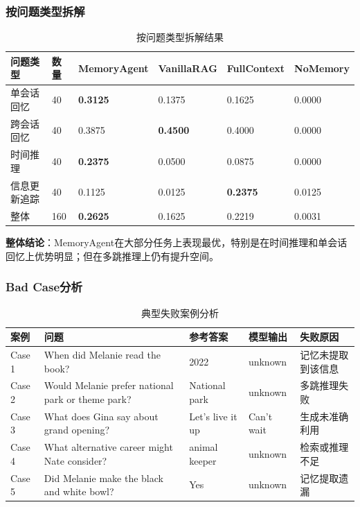 \documentclass[11pt]{article}
\begin{document}
\subsubsection{按问题类型拆解}

\begin{table}[H]
    \centering
    \begin{tabular}{|l|l|l|l|l|l|}
        \hline
        问题类型 & 数量 & MemoryAgent & VanillaRAG & FullContext & NoMemory \\
        \hline
        单会话回忆 & 40 & \textbf{0.3125} & 0.1375 & 0.1625 & 0.0000 \\
        \hline
        跨会话回忆 & 40 & 0.3875 & \textbf{0.4500} & 0.4000 & 0.0000 \\
        \hline
        时间推理 & 40 & \textbf{0.2375} & 0.0500 & 0.0875 & 0.0000 \\
        \hline
        信息更新追踪 & 40 & 0.1125 & 0.0125 & \textbf{0.2375} & 0.0125 \\
        \hline
        整体 & 160 & \textbf{0.2625} & 0.1625 & 0.2219 & 0.0031 \\
        \hline
    \end{tabular}
    \caption{按问题类型拆解结果}
\end{table}

\textbf{整体结论}：MemoryAgent在大部分任务上表现最优，特别是在时间推理和单会话回忆上优势明显；但在多跳推理上仍有提升空间。

\subsubsection{Bad Case分析}

\begin{table}[H]
    \centering
    \begin{tabularx}{\textwidth}{|l|X|l|l|l|}
        \hline
        案例 & 问题 & 参考答案 & 模型输出 & 失败原因 \\
        \hline
        Case 1 & When did Melanie read the book? & 2022 & unknown & 记忆未提取到该信息 \\
        \hline
        Case 2 & Would Melanie prefer national park or theme park? & National park & unknown & 多跳推理失败 \\
        \hline
        Case 3 & What does Gina say about grand opening? & Let's live it up & Can't wait & 生成未准确利用 \\
        \hline
        Case 4 & What alternative career might Nate consider? & animal keeper & unknown & 检索或推理不足 \\
        \hline
        Case 5 & Did Melanie make the black and white bowl? & Yes & unknown & 记忆提取遗漏 \\
        \hline
    \end{tabularx}
    \caption{典型失败案例分析}
\end{table}
\end{document}
